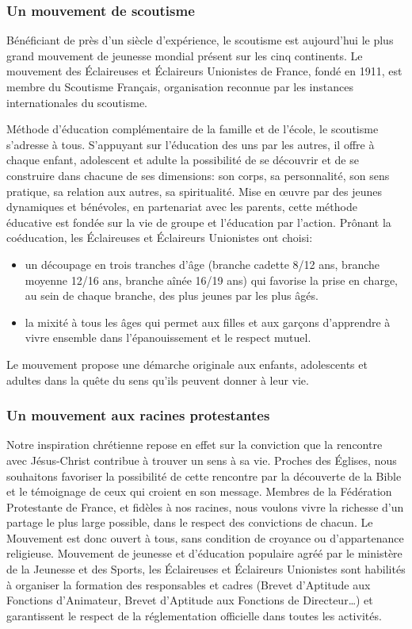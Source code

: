 \documentclass[titlepage,11pt,a4paper]{article}
\begin{document}
\subsubsection*{Un mouvement de scoutisme}

Bénéficiant de près d'un siècle d'expérience, le scoutisme est aujourd'hui le plus grand mouvement de jeunesse mondial présent sur les cinq continents. Le mouvement des Éclaireuses et Éclaireurs Unionistes de France, fondé en 1911, est membre du Scoutisme Français, organisation reconnue par les instances internationales du scoutisme.

Méthode d'éducation complémentaire de la famille et de l'école, le scoutisme s'adresse à tous. S'appuyant sur l'éducation des uns par les autres, il offre à chaque enfant, adolescent et adulte la possibilité de se découvrir et de se construire dans chacune de ses dimensions: son corps, sa personnalité, son sens pratique, sa relation aux autres, sa spiritualité. Mise en œuvre par des jeunes dynamiques et bénévoles, en partenariat avec les parents, cette méthode éducative est fondée sur la vie de groupe et l'éducation par l'action. Prônant la coéducation, les Éclaireuses et Éclaireurs Unionistes ont choisi:
\begin{itemize}
   \item un découpage en trois tranches d'âge (branche cadette 8/12 ans, branche moyenne 12/16 ans, branche aînée 16/19 ans) qui favorise la prise en charge, au sein de chaque branche,
      des plus jeunes par les plus âgés.
   \item la mixité à tous les âges qui permet aux filles et aux garçons d'apprendre à vivre ensemble dans l'épanouissement et le respect mutuel.
\end{itemize}

Le mouvement propose une démarche originale aux enfants, adolescents et adultes dans la quête du sens qu'ils peuvent donner à leur vie.

\subsubsection*{Un mouvement aux racines protestantes}
Notre inspiration chrétienne repose en effet sur la conviction que la rencontre avec Jésus-Christ
contribue à trouver un sens à sa vie.  Proches des Églises, nous souhaitons favoriser la possibilité
de cette rencontre par la découverte de la Bible et le témoignage de ceux qui croient en son message.
Membres de la Fédération Protestante de France, et fidèles à nos racines, nous voulons vivre la richesse
d'un partage le plus large possible, dans le respect des convictions de chacun. Le Mouvement est donc ouvert à tous,
sans condition de croyance ou d'appartenance religieuse.  Mouvement de jeunesse et d'éducation populaire
agréé par le ministère de la Jeunesse et des Sports, les Éclaireuses et Éclaireurs Unionistes sont habilités
à organiser la formation des responsables et cadres (Brevet d'Aptitude aux Fonctions d'Animateur,
Brevet d'Aptitude aux Fonctions de Directeur…) et garantissent le respect de la réglementation officielle dans toutes les activités.
\end{document}

